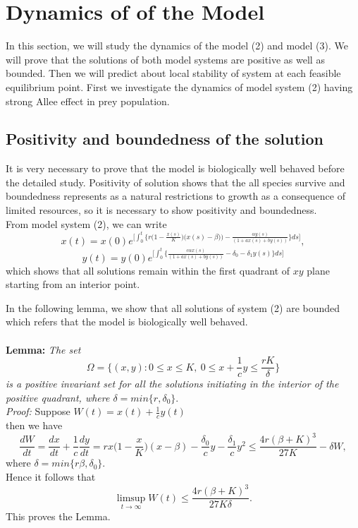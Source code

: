 \documentclass[a4paper, 10pt]{article}
\begin{document}
	\section{Dynamics of of the Model}
	In this section, we will study the dynamics of the model (2) and model (3). We will prove that the solutions of both model systems are positive as well as bounded. Then we will predict about local stability of system at each feasible  equilibrium point. First we investigate the dynamics of model system (2) having strong Allee effect in prey population.
	\subsection{Positivity and boundedness of the solution}
	It is very necessary to prove that the model is biologically well behaved before the detailed study. Positivity of solution shows that the all species survive and boundedness represents as a natural restrictions to growth as a consequence of limited resources, so it is necessary to show positivity and boundedness.\\
	From model system (2), we can write
	\[x(t)=x(0)e^{\big[\int_{0}^{t}\big\{r\big(1-\frac{x(s)}{K}\big)\big(x(s)-\beta)\big)-\frac{\alpha y(s)}{(1+ax(s)+by(s))}\big\}ds\big]},\]
	\[y(t)=y(0)e^{\big[\int_{0}^{t}\big\{\frac{c\alpha x(s)}{(1+ax(s)+by(s))}-\delta_0-\delta_1 y(s)\big\}ds\big]}\]
	which shows that all solutions remain within the first quadrant of $xy$ plane starting from an interior point.\par
	In the following lemma, we show that all solutions of system (2) are bounded which refers that the model is biologically well behaved.\\\\
	\textbf{Lemma:} \textit{The set
		\[\Omega=\Big\{(x,y): 0\leq x \leq K,~0 \leq x+\frac{1}{c}y\leq \frac{rK}{\delta}\Big\}\]
		is a positive invariant set for all the solutions initiating in the interior of the positive quadrant, where $\delta =min\{r,\delta_0\}.$\\
		Proof:} Suppose $W(t)=x(t)+\frac{1}{c}y(t)$\\
	then we have
	\[\frac{dW}{dt}=\frac{dx}{dt}+\frac{1}{c}\frac{dy}{dt} = rx\big(1-\frac{x}{K}\big)(x-\beta)-\frac{\delta_0}{c}y-\frac{\delta_1}{c}y^2 \leq \frac{4r(\beta+K)^3}{27K}-\delta W,\]
	where $\delta =min\{r\beta,\delta_0\}.$\\
	Hence it follows that
	\[\limsup_{t\rightarrow{\infty}} W(t) \leq \frac{4r (\beta+K)^3}{27K\delta}.\]
	This proves the Lemma.
\end{document}
